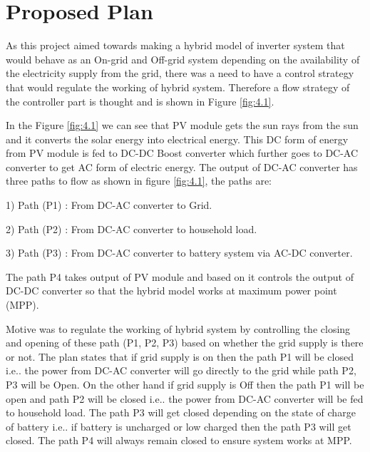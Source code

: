 \documentclass[a4paper,12pt]{iitmdiss}
\begin{document}
\section{Proposed Plan}
As this project aimed towards making a hybrid model of inverter system that would behave as an On-grid and Off-grid system depending on the availability of the electricity supply from the grid, there was a need to have a control strategy that would regulate the working of hybrid system. Therefore a flow strategy of the controller part is thought and is shown in Figure \ref{fig:4.1}.

In the Figure \ref{fig:4.1} we can see that PV module gets the sun rays from the sun and it converts the solar energy into electrical energy. This DC form of energy from PV module is fed to DC-DC Boost converter which further goes to DC-AC converter to get AC form of electric energy. The output of DC-AC converter has three paths to flow as shown in figure \ref{fig:4.1}, the paths are:

1) Path (P1) : From DC-AC converter to Grid.

2) Path (P2) : From DC-AC converter to household load.

3) Path (P3) : From DC-AC converter to battery system via AC-DC converter.

The path P4 takes output of PV module and based on it controls the output of DC-DC converter so that the hybrid model works at maximum power point (MPP).

Motive was to regulate the working of hybrid system by controlling the closing and opening of these path (P1, P2, P3) based on whether the grid supply is there or not. The plan states that if grid supply is on then the path P1 will be closed i.e.. the power from DC-AC converter will go directly to the grid while path P2, P3 will be Open. On the other hand if grid supply is Off then the path P1 will be open and path P2 will be closed i.e.. the power from DC-AC converter will be fed to household load. The path P3 will get closed depending on the state of charge of battery i.e.. if battery is uncharged or low charged then the path P3 will get closed. The path P4 will always remain closed to ensure system works at MPP.
\end{document}
